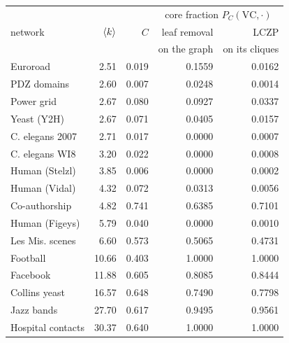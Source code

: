 \begin{tabular}{lrrrr}
\hline\hline
 & & & \multicolumn{2}{c}{core fraction $P_{C}(\mathrm{VC},\cdot)$}\\
network & $\langle k \rangle$ & $C$ & leaf removal & LCZP\\
 & & & on the graph & on its cliques\\
\hline
Euroroad & 2.51 & 0.019 & 0.1559 & 0.0162\\
PDZ domains & 2.60 & 0.007 & 0.0248 & 0.0014\\
Power grid & 2.67 & 0.080 & 0.0927 & 0.0337\\
Yeast (Y2H) & 2.67 & 0.071 & 0.0405 & 0.0157\\
C. elegans 2007 & 2.71 & 0.017 & 0.0000 & 0.0007\\
C. elegans WI8 & 3.20 & 0.022 & 0.0000 & 0.0008\\
Human (Stelzl) & 3.85 & 0.006 & 0.0000 & 0.0002\\
Human (Vidal) & 4.32 & 0.072 & 0.0313 & 0.0056\\
Co-authorship & 4.82 & 0.741 & 0.6385 & 0.7101\\
Human (Figeys) & 5.79 & 0.040 & 0.0000 & 0.0010\\
Les Mis. scenes & 6.60 & 0.573 & 0.5065 & 0.4731\\
Football & 10.66 & 0.403 & 1.0000 & 1.0000\\
Facebook & 11.88 & 0.605 & 0.8085 & 0.8444\\
Collins yeast & 16.57 & 0.648 & 0.7490 & 0.7798\\
Jazz bands & 27.70 & 0.617 & 0.9495 & 0.9561\\
Hospital contacts & 30.37 & 0.640 & 1.0000 & 1.0000\\
\hline\hline
\end{tabular}
